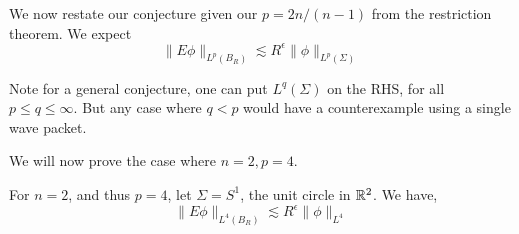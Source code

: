 We now restate our conjecture given our $p=2n/(n-1)$ from the restriction theorem. We expect
\begin{equation*}
    \|E\phi\|_{L^p(B_R)}\lesssim R^\epsilon\|\phi\|_{L^p(\Sigma)}
\end{equation*}
\begin{remark}
    Note for a general conjecture, one can put $L^q(\Sigma)$ on the RHS, for all $p\leq q\leq\infty$. But any case where $q<p$ would have a counterexample using a single wave packet.
\end{remark}
We will now prove the case where $n=2, p=4$.
\begin{theorem}
    For $n=2$, and thus $p=4$, let $\Sigma=S^1$, the unit circle in $\mathbb{R}^2$. We have, 
    \begin{equation*}
        \|E\phi\|_{L^4(B_R)}\lesssim R^\epsilon\|\phi\|_{L^4}
    \end{equation*}
\end{theorem}
